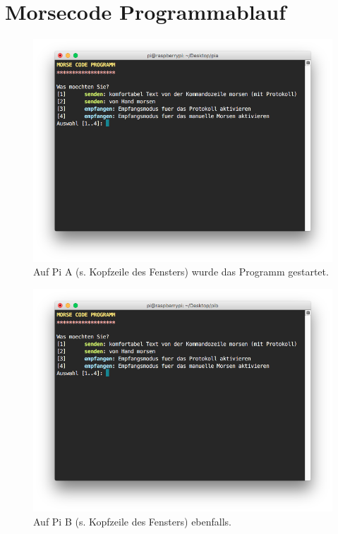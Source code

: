 \documentclass[12pt, a4paper]{article}
\begin{document}
\section*{Morsecode Programmablauf}

\begin{figure}[H]
	\centering
	\includegraphics[width=1.0\textwidth]{sshot_1.png}
	\caption{Auf Pi A (s. Kopfzeile des Fensters) wurde das Programm gestartet.}
\end{figure}

\newpage
\begin{figure}[H]
	\centering
	\includegraphics[width=1.0\textwidth]{sshot_2.png}
	\caption{Auf Pi B (s. Kopfzeile des Fensters) ebenfalls.}
\end{figure}
\end{document}
